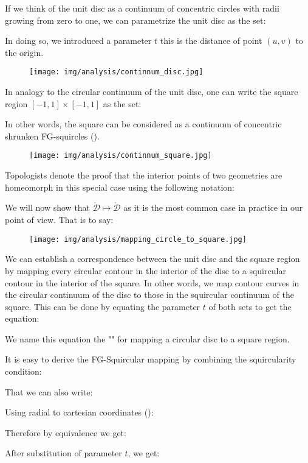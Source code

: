 	If we think of the unit disc as a continuum of concentric circles with radii growing from zero to one, we can parametrize the unit disc as the set:
	
	In doing so, we introduced a parameter $t$ this is the distance of point $(u,v)$ to the origin.
	\begin{figure}[H]
		\centering
		\texttt{[image: img/analysis/continnum\_disc.jpg]}
	\end{figure}
	In analogy to the circular continuum of the unit disc, one can write the square region $[-1,1] \times [-1,1]$ as the set:
	
	In other words, the square can be considered as a continuum of concentric shrunken FG-squircles ().
	\begin{figure}[H]
		\centering
		\texttt{[image: img/analysis/continnum\_square.jpg]}
	\end{figure}

	Topologists denote the proof that the interior points of two geometries are homeomorph in this special case using the following notation:
	
	We will now show that $\mathring{\mathcal{D}}\mapsto \mathring{\mathcal{D}}$ as it is the most common case in practice in our point of view. That is to say:
	\begin{figure}[H]
		\centering
		\texttt{[image: img/analysis/mapping\_circle\_to\_square.jpg]}
	\end{figure}
	We can establish a correspondence between the unit disc and the square region by mapping every circular contour in the interior of the disc to a squircular contour in the interior of the square. In other words, we map contour curves in the circular continuum of the disc to those in the squircular continuum of the square. This can be done by equating the parameter $t$ of both sets to get the equation:
	
	We name this equation the "" for mapping a circular disc to a square region.
	
	It is easy to derive the FG-Squircular mapping by combining the squircularity condition:
	
	That we can also write:
	
	Using radial to cartesian coordinates ():
	
	Therefore by equivalence we get:
	
	After substitution of parameter $t$, we get:
	


